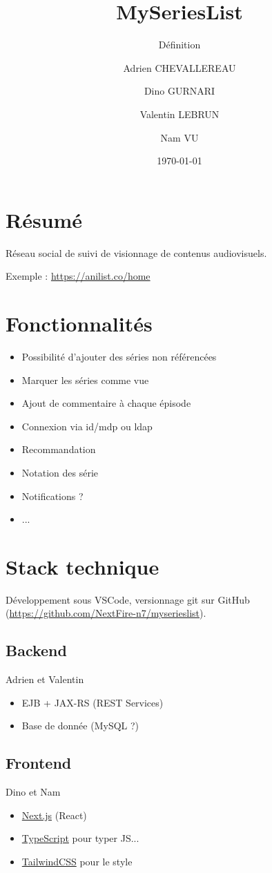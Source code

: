 \documentclass[headings=standardclasses,parskip=half]{scrartcl}
\title{MySeriesList}
\subtitle{Définition}
\author{Adrien CHEVALLEREAU \and Dino GURNARI \and Valentin LEBRUN \and Nam VU}
\date{\today}
\begin{document}
\maketitle

\section*{Résumé}

Réseau social de suivi de visionnage de contenus audiovisuels.

Exemple : \url{https://anilist.co/home}

\section*{Fonctionnalités}

\begin{itemize}
    \item Possibilité d’ajouter des séries non référencées
    \item Marquer les séries comme vue
    \item Ajout de commentaire à chaque épisode
    \item Connexion via id/mdp ou ldap
    \item Recommandation
    \item Notation des série
    \item Notifications ?
    \item ...
\end{itemize}

\section*{Stack technique}

Développement sous VSCode, versionnage git sur GitHub (\url{https://github.com/NextFire-n7/myserieslist}).

\subsection*{Backend}

Adrien et Valentin

\begin{itemize}
    \item EJB + JAX-RS (REST Services)
    \item Base de donnée (MySQL ?)
\end{itemize}

\subsection*{Frontend}

Dino et Nam

\begin{itemize}
    \item \href{https://nextjs.org}{Next.js} (React)
    \item \href{https://www.typescriptlang.org}{TypeScript} pour typer JS...
    \item \href{https://tailwindcss.com}{TailwindCSS} pour le style
\end{itemize}
\end{document}
